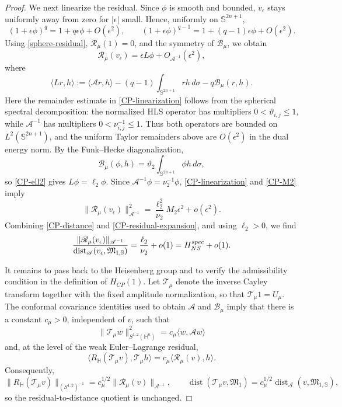 \documentclass[10pt,a4paper]{amsart}
\begin{document}
\begin{proof}
We next linearize the residual. Since $\phi$ is smooth and bounded, $v_\epsilon$ stays uniformly away from zero for $|\epsilon|$ small. Hence, uniformly on $\mathbb S^{2n+1}$,
\[
 (1+\epsilon\phi)^q=1+q\epsilon\phi+O(\epsilon^2),
 \qquad
 (1+\epsilon\phi)^{q-1}=1+(q-1)\epsilon\phi+O(\epsilon^2).
\]
Using \eqref{sphere-residual}, $\mathscr R_\mu(1)=0$, and the symmetry of $\mathcal B_\mu$, we obtain
\begin{equation}\label{CP-linearization}
 \mathscr R_\mu(v_\epsilon)=\epsilon L\phi+O_{\mathscr A^{-1}}(\epsilon^2),
\end{equation}
where
\[
 \langle Lr,h\rangle
 :=\langle\mathscr Ar,h\rangle
 -(q-1)\int_{\mathbb S^{2n+1}}rh\,d\sigma
 -q\mathcal B_\mu(r,h).
\]
Here the remainder estimate in \eqref{CP-linearization} follows from the spherical spectral decomposition: the normalized HLS operator has multipliers $0<\vartheta_{i,j}\le1$, while $\mathscr A^{-1}$ has multipliers $0<\nu_{i,j}^{-1}\le1$. Thus both operators are bounded on $L^2(\mathbb S^{2n+1})$, and the uniform Taylor remainders above are $O(\epsilon^2)$ in the dual energy norm. By the Funk--Hecke diagonalization,
\[
 \mathcal B_\mu(\phi,h)=\vartheta_2
 \int_{\mathbb S^{2n+1}}\phi h\,d\sigma,
\]
so \eqref{CP-ell2} gives $L\phi=\ell_2\phi$. Since $\mathscr A^{-1}\phi=\nu_2^{-1}\phi$, \eqref{CP-linearization} and \eqref{CP-M2} imply
\begin{equation}\label{CP-residual-expansion}
 \|\mathscr R_\mu(v_\epsilon)\|_{\mathscr A^{-1}}^2
 =\frac{\ell_2^2}{\nu_2}M_2\epsilon^2+o(\epsilon^2).
\end{equation}
Combining \eqref{CP-distance} and \eqref{CP-residual-expansion}, and using $\ell_2>0$, we find
\begin{equation}\label{CP-quotient-limit}
 \frac{\|\mathscr R_\mu(v_\epsilon)\|_{\mathscr A^{-1}}}
 {\operatorname{dist}_{\mathscr A}(v_\epsilon,\mathfrak M_{1,\mathbb S})}
 =\frac{\ell_2}{\nu_2}+o(1)
 =H_{NS}^{\rm spec}+o(1).
\end{equation}

It remains to pass back to the Heisenberg group and to verify the admissibility condition in the definition of $H_{CP}(1)$. Let $\mathcal T_\mu$ denote the inverse Cayley transform together with the fixed amplitude normalization, so that $\mathcal T_\mu 1=U_\mu$. The conformal covariance identities used to obtain $\mathscr A$ and $\mathcal B_\mu$ imply that there is a constant $c_\mu>0$, independent of $v$, such that
\[
 \|\mathcal T_\mu w\|_{S^{1,2}(\mathbb H^n)}^2
 =c_\mu\langle w,\mathscr Aw\rangle
\]
and, at the level of the weak Euler--Lagrange residual,
\[
 \big\langle R_{\mathbb H}(\mathcal T_\mu v),\mathcal T_\mu h\big\rangle
 =c_\mu\big\langle\mathscr R_\mu(v),h\big\rangle.
\]
Consequently,
\[
 \|R_{\mathbb H}(\mathcal T_\mu v)\|_{(S^{1,2})^{-1}}
 =c_\mu^{1/2}\|\mathscr R_\mu(v)\|_{\mathscr A^{-1}},
 \qquad
 \operatorname{dist}(\mathcal T_\mu v,\mathfrak M_1)
 =c_\mu^{1/2}\operatorname{dist}_{\mathscr A}(v,\mathfrak M_{1,\mathbb S}),
\]
so the residual-to-distance quotient is unchanged.


\end{proof}
\end{document}
